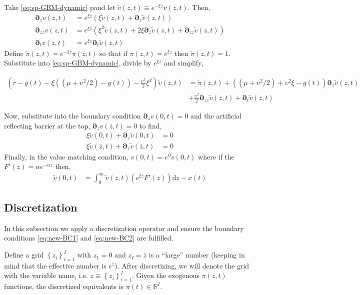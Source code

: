 \documentclass[11pt]{article}
\newcommand{\D}[1][]{\ensuremath{\boldsymbol{\partial}_{#1}}}
\newcommand{\R}{\ensuremath{\mathbb{R}}}
\newcommand{\diff}{\ensuremath{\mathrm{d}}}
\newcommand{\set}[1]{\ensuremath{\left\{{#1}\right\}}}
\begin{document}
Take \cref{eq:sp-GBM-dynamic} pand let $\tilde{v}(z,t) \equiv e^{-\xi z}v(z,t)$.  Then,
\begin{align}
	\D[z]v(z,t) &= e^{\xi z}\left(\xi\tilde{v}(z,t) + \D[z]\tilde{v}(z,t) \right)\\
	\D[zz]v(z,t) &= e^{\xi z}\left(\xi^{2}\tilde{v}(z,t) + 2 \xi\D[z]\tilde{v}(z,t) + \D[zz]\tilde{v}(z,t)  \right)\\	
	\D[t]v(z,t) &= e^{\xi z} \D[t] \tilde{v}(z,t)
\end{align}
Define $\tilde{\pi}(z,t) = e^{-\xi z}\pi(z,t)$ so that if $\pi(z,t) = e^{\xi z}$ then $\tilde{\pi}(z,t) = 1$.  Substitute into \cref{eq:sp-GBM-dynamic}, divide by $e^{\xi z}$ and simplify,

\begin{align}
	\left(r - g(t)- \xi((\mu + \upsilon^2/2)-g(t)) - \frac{\upsilon^2}{2}\xi^2\right) \tilde{v}(z,t) &= \tilde{\pi}(z,t) + ((\mu + \upsilon^2/2) + \upsilon^2\xi - g(t)) \D[z] \tilde{v}(z,t) \nonumber \\ &+ \tfrac{\upsilon^2}{2} \D[zz] \tilde{v}(z,t) + \D[t]\tilde{v}(z,t)  \label{eq:bellman-GBM-dynamic-normalized}
\end{align}

Now, substitute into the boundary condition $\D[z]v(0,t) = 0$ and the artificial reflecting barrier at the top, $\D[z]v(\bar{z},t) = 0$ to find,
\begin{align}
	\xi\tilde{v}(0,t) + \D[z]\tilde{v}(0,t ) &= 0\label{eq:new-BC1}\\
	\xi\tilde{v}(\bar{z},t) + \D[z]\tilde{v}(\bar{z},t) &= 0\label{eq:new-BC2}
\end{align}	
Finally, in the value matching condition, $v(0,t) = e^{0}\tilde{v}(0,t)$ where if the $F'(z) = \alpha e^{-\alpha z}$ then,
\begin{align}
	\tilde{v}(0,t) &= \int_{0}^{\infty} \tilde{v}(z,t) \left(e^{\xi z} F'(z)\right) \diff z - x(t)\label{eq:vm-GBM-dynamic-normalized}
\end{align}	

\subsection{Discretization}

In this subsection we apply a discretization operator and ensure the boundary conditions \cref{eq:new-BC1} and \cref{eq:new-BC2} are fulfilled. 

Define a  grid $\set{z_i}_{i=1}^I$ with $z_1 = 0$ and $z_I = \bar{z}$ is a ``large'' number (keeping in mind that the effective number is $e^{\bar{z}}$).  After discretizing, we will denote the grid with the variable name, i.e. $z \equiv \set{z_i}_{i=1}^I$.  Given the exogenous $\pi(z,t)$ functions, the discretized equivalents is $\pi(t) \in \R^I$.
\end{document}
